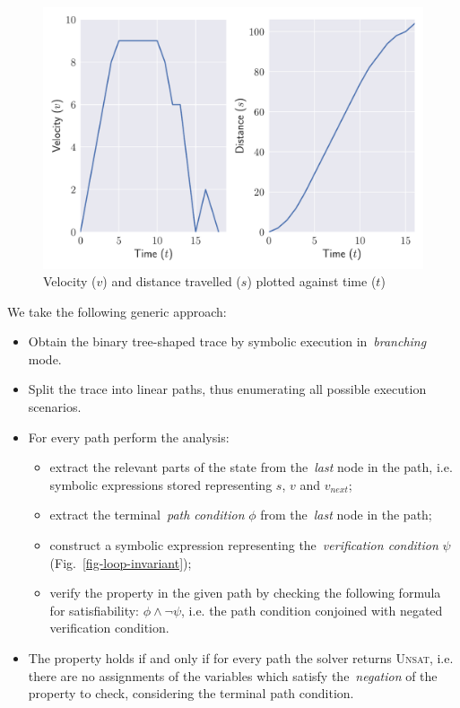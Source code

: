 \begin{figure}
\centerline{\includegraphics[scale=0.50]{fig/motor_control_graph.pdf}}
\caption{Velocity ($v$) and distance travelled ($s$) plotted against time ($t$)\label{fig-motor}}
\end{figure}

\noindent
We take the following generic approach:

\begin{itemize}
  \item Obtain the binary tree-shaped trace by symbolic execution in~\emph{branching} mode.
  \item Split the trace into linear paths, thus enumerating all possible
    execution scenarios.
  \item For every path perform the analysis:
    \begin{itemize}
      \item extract the relevant parts of the state from the~\emph{last} node in
        the path, i.e. symbolic expressions stored representing $s$,
        $v$ and $v_{next}$;
      \item extract the terminal~\emph{path condition} $\phi$
            from the~\emph{last} node in the path;
      \item construct a symbolic expression representing the~\emph{verification condition}
            $\psi$ (Fig.~\ref{fig-loop-invariant});
      \item verify the property in the given path by checking the following
        formula for satisfiability: $\phi \land \lnot\psi$, i.e. the path condition
        conjoined with negated verification condition.

    \end{itemize}
    \item  The property holds if and only if for every path the solver returns
           \textsc{Unsat}, i.e. there are no assignments of the variables which
           satisfy the~\emph{negation} of the property to check, considering the
           terminal path condition.
\end{itemize}

